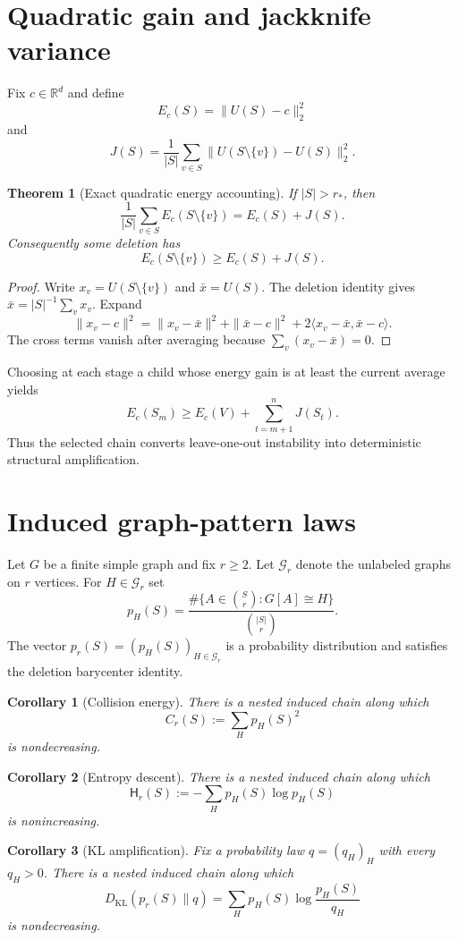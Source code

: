 \documentclass[11pt]{article}
\newtheorem{theorem}{Theorem}
\newtheorem{corollary}{Corollary}
\newcommand{\R}{\mathbb R}
\newcommand{\KL}{D_{\mathrm{KL}}}
\begin{document}
\section{Quadratic gain and jackknife variance}
Fix $c\in\R^d$ and define
\[
E_c(S)=\|U(S)-c\|_2^2
\]
and
\[
J(S)=\frac1{|S|}\sum_{v\in S}
\|U(S\setminus\{v\})-U(S)\|_2^2.
\]

\begin{theorem}[Exact quadratic energy accounting]
If $|S|>r_*$, then
\[
\frac1{|S|}\sum_{v\in S}E_c(S\setminus\{v\})=E_c(S)+J(S).
\]
Consequently some deletion has
\[
E_c(S\setminus\{v\})\ge E_c(S)+J(S).
\]
\end{theorem}

\begin{proof}
Write $x_v=U(S\setminus\{v\})$ and $\bar x=U(S)$. The deletion identity gives $\bar x=|S|^{-1}\sum_v x_v$. Expand
\[
\|x_v-c\|^2
=\|x_v-\bar x\|^2+\|\bar x-c\|^2
+2\langle x_v-\bar x,\bar x-c\rangle.
\]
The cross terms vanish after averaging because $\sum_v(x_v-\bar x)=0$.
\end{proof}

Choosing at each stage a child whose energy gain is at least the current average yields
\[
E_c(S_m)\ge E_c(V)+\sum_{t=m+1}^{n}J(S_t).
\]
Thus the selected chain converts leave-one-out instability into deterministic structural amplification.

\section{Induced graph-pattern laws}
Let $G$ be a finite simple graph and fix $r\ge2$. Let $\mathcal G_r$ denote the unlabeled graphs on $r$ vertices. For $H\in\mathcal G_r$ set
\[
p_H(S)=\frac{\#\{A\in\binom Sr:G[A]\cong H\}}{\binom{|S|}{r}}.
\]
The vector $p_r(S)=(p_H(S))_{H\in\mathcal G_r}$ is a probability distribution and satisfies the deletion barycenter identity.

\begin{corollary}[Collision energy]
There is a nested induced chain along which
\[
C_r(S):=\sum_H p_H(S)^2
\]
is nondecreasing.
\end{corollary}

\begin{corollary}[Entropy descent]
There is a nested induced chain along which
\[
\mathsf H_r(S):=-\sum_H p_H(S)\log p_H(S)
\]
is nonincreasing.
\end{corollary}

\begin{corollary}[KL amplification]
Fix a probability law $q=(q_H)_H$ with every $q_H>0$. There is a nested induced chain along which
\[
\KL(p_r(S)\|q)=\sum_H p_H(S)\log\frac{p_H(S)}{q_H}
\]
is nondecreasing.
\end{corollary}
\end{document}
